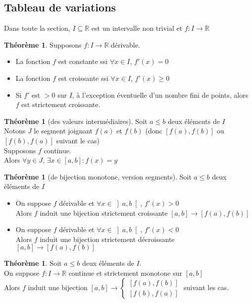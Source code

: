 \documentclass[10pt,a4paper]{article}
\theoremstyle{definition}
\newtheorem{theorem}[proposition]{Théorème}
\begin{document}
\subsection{Tableau de variations}
Dans toute la section, $I \subseteq \mathbb{R}$ est un intervalle non trivial et $f: I \to \mathbb{R}$
\begin{theorem}
Supposons $f: I \to \mathbb{R}$ dérivable.
\begin{itemize}
\item La fonction $f$ est constante ssi $\forall x \in I$, $f'(x) = 0$
\item La fonction $f$ est croissante ssi $\forall x \in I$, $f'(x) \geq 0$
\item Si $f'$ est $> 0$ sur $I$, à l'exception éventuelle d'un nombre fini de points, alors $f$ est strictement croissante.
\end{itemize}
\end{theorem}
\begin{theorem}[des valeurs intermédiaires]
Soit $a \leq b$ deux éléments de $I$ \\
Notons $J$ le segment joignant $f(a)$ et $f(b)$ (donc $\left[ f(a), f(b) \right]$ ou $\left[ f(b), f(a) \right]$ suivant le cas) \\
Supposons $f$ continue. \\
Alors $\forall y \in J$, $\exists x \in \left[ a, b \right]: f(x) = y$
\end{theorem}
\begin{theorem}[de bijection monotone, version segments]
Soit $a \leq b$ deux éléments de $I$
\begin{itemize}
\item On suppose $f$ dérivable et $\forall x \in \left] a, b \right[$, $f'(x) > 0$ \\
Alors $f$ induit une bijection strictement croissante $[a, b] \to \left[f(a), f(b)\right]$
\item On suppose $f$ dérivable et $\forall x \in \left] a, b \right[$, $f'(x) < 0$ \\
Alors $f$ induit une bijection strictement décroissante $\left[ a, b \right] \to \left[ f(a), f(b) \right]$
\end{itemize}
\end{theorem}
\begin{theorem}
Soit $a \leq b$ deux éléments de $I$. \\
On suppose $f: I \to \mathbb{R}$ continue et strictement monotone sur $[a, b]$ \\
Alors $f$ induit une bijection $[a, b] \to \begin{cases}
\left[ f(a), f(b) \right] \\
\left[ f(b), f(a) \right]
\end{cases}$ suivant les cas.
\end{theorem}
\end{document}
